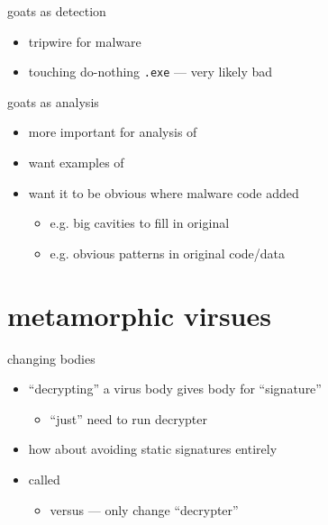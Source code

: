 \begin{frame}{goats as detection}
    \begin{itemize}
    \item tripwire for malware
    \item touching do-nothing {\tt .exe} --- very likely bad
    \end{itemize}
\end{frame}

\begin{frame}{goats as analysis}
    \begin{itemize}
    \item more important for analysis of 
    \item want examples of 
    \item want it to be obvious where malware code added
        \begin{itemize}
        \item e.g. big cavities to fill in original
        \item e.g. obvious patterns in original code/data
        \end{itemize}
    \end{itemize}
\end{frame}

\section{metamorphic virsues}

\begin{frame}{changing bodies}
    \begin{itemize}
    \item ``decrypting'' a virus body gives body for ``signature''
        \begin{itemize}
        \item ``just'' need to run decrypter
        \end{itemize}
    \item how about avoiding static signatures entirely
    \item called 
        \begin{itemize}
        \item versus  --- only change ``decrypter''
        \end{itemize}
    \end{itemize}
\end{frame}

